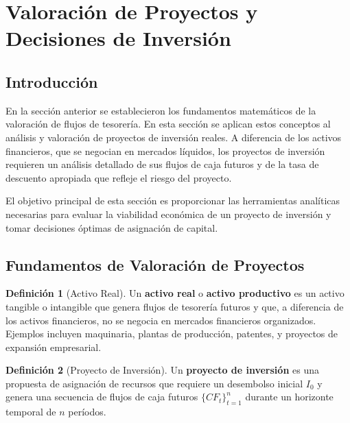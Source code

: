 \documentclass[12pt,a4paper]{article}
\theoremstyle{definition}
\newtheorem{definicion}{Definición}[section]
\begin{document}
\begin{center}
    
\end{center}

\section{Valoración de Proyectos y Decisiones de Inversión}

\subsection{Introducción}

En la sección anterior se establecieron los fundamentos matemáticos de la valoración de flujos de tesorería. En esta sección se aplican estos conceptos al análisis y valoración de proyectos de inversión reales. A diferencia de los activos financieros, que se negocian en mercados líquidos, los proyectos de inversión requieren un análisis detallado de sus flujos de caja futuros y de la tasa de descuento apropiada que refleje el riesgo del proyecto.

El objetivo principal de esta sección es proporcionar las herramientas analíticas necesarias para evaluar la viabilidad económica de un proyecto de inversión y tomar decisiones óptimas de asignación de capital.

\subsection{Fundamentos de Valoración de Proyectos}

\begin{definicion}[Activo Real]
Un \textbf{activo real} o \textbf{activo productivo} es un activo tangible o intangible que genera flujos de tesorería futuros y que, a diferencia de los activos financieros, no se negocia en mercados financieros organizados. Ejemplos incluyen maquinaria, plantas de producción, patentes, y proyectos de expansión empresarial.
\end{definicion}

\begin{definicion}[Proyecto de Inversión]
Un \textbf{proyecto de inversión} es una propuesta de asignación de recursos que requiere un desembolso inicial $I_0$ y genera una secuencia de flujos de caja futuros $\{CF_t\}_{t=1}^{n}$ durante un horizonte temporal de $n$ períodos.
\end{definicion}
\end{document}
